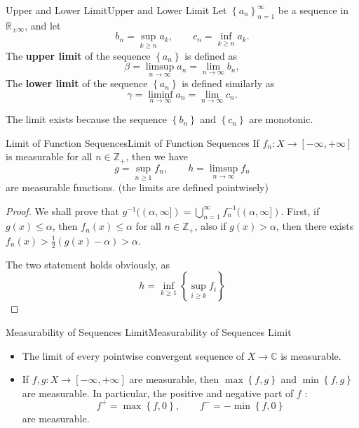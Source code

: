 \documentclass[../main.tex]{subfiles}
\begin{document}
\begin{definition}{Upper and Lower Limit}{Upper and Lower Limit}
Let $\left\{ a_n \right\}_{n=1}^{\infty }$ be a sequence in $\mathbb{R}_{\pm \infty }$, and let
\begin{equation}
	b_n = \sup_{k\geq n} a_k, \qquad c_n = \inf_{k\geq n} a_k.
\end{equation}
The \textbf{upper limit} of the sequence $\left\{ a_n \right\}$ is defined as
\begin{equation}
	\beta = \limsup_{n\rightarrow \infty } a_n = \lim_{n\rightarrow \infty } b_n,
\end{equation}
The \textbf{lower limit} of the sequence $\left\{ a_n \right\}$ is defined similarly as
\begin{equation}
	\gamma = \liminf_{n\rightarrow \infty } a_n = \lim_{n\rightarrow \infty } c_n.
\end{equation}
\end{definition}
\begin{remark}
	The limit exists because the sequence $\left\{ b_n \right\}$ and $\left\{ c_n \right\}$ are monotonic.
\end{remark}

\begin{theorem}{Limit of Function Sequences}{Limit of Function Sequences}
	If $f_n: X \rightarrow [-\infty ,+\infty ]$ is measurable for all $n\in \mathbb{Z}_+$, then we have
	\begin{equation*}
		g = \sup_{n \geq 1} f_n, \qquad h = \limsup_{n\rightarrow \infty } f_n
	\end{equation*}
	are measurable functions. (the limits are defined pointwisely)
\end{theorem}
\begin{proof}
	We shall prove that $g^{-1}((\alpha,\infty ]) = \bigcup_{n=1}^{\infty } f_n^{-1}((\alpha, \infty ])$. First, if $g(x) \leq \alpha$, then $f_n(x) \leq \alpha$ for all $n\in \mathbb{Z}_+$, also if $g(x) > \alpha$, then there exists $f_n(x) > \frac{1}{2}(g(x) - \alpha) > \alpha$.

	The two statement holds obviously, as
	\begin{equation*}
	h = \inf_{k \geq 1} \left\{ \sup_{i\geq k}f_i \right\}
	\end{equation*}
\end{proof}

\begin{corollary}{Measurability of Sequences Limit}{Measurability of Sequences Limit}
\begin{itemize}
\item The limit of every pointwise convergent sequence of $X \rightarrow \mathbb{C}$ is measurable.
\item If $f,g: X \rightarrow [-\infty ,+\infty ]$ are measurable, then $\max \left\{ f,g \right\}$ and $\min \left\{ f,g \right\}$ are measurable. In particular, the positive and negative part of $f$ :
	\begin{equation*}
		f^+ = \max \left\{ f,0 \right\}, \qquad f^- = -\min \left\{ f,0 \right\}
	\end{equation*}
	are measurable.
\end{itemize}
\end{corollary}
\end{document}
